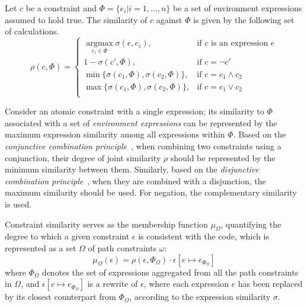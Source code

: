 \begin{definition}
Let $c$ be a constraint and $\Phi = \{e_i | i=1,\ldots,n\}$ be a set of
environment expressions assumed to hold true.
The similarity of $c$ against $\Phi$ is given by the following set of calculations.
\begin{equation}\label{eq:js}
    \rho(c,\Phi) =
    \begin{cases}
        \mathop{\arg\max}\limits_{e_i \in \Phi} \sigma(e, e_i),
        & \text{if } c \text{ is an expression } e \\
        1 - \sigma(c', \Phi), & \text{if $c = \neg c'$} \\
        \min\{\sigma(c_1, \Phi), \sigma(c_2, \Phi)\}, & \text{if } c = c_1 \wedge c_2 \\
        \max\{\sigma(c_1, \Phi), \sigma(c_2, \Phi)\}, & \text{if } c = c_1 \vee c_2 \\
    \end{cases}
\end{equation}
\end{definition}

Consider an atomic constraint with a single expression; its similarity to $\Phi$ associated with
a set of \emph{environment expressions} can be represented by the maximum expression similarity among
all expressions within $\Phi$.
Based on the \textit{conjunctive combination principle}~\cite{zadeh1965fuzzy}, when combining two
constraints using a conjunction, their degree of joint similarity $\rho$ should be represented by
the minimum similarity between them. Similarly, based on the \textit{disjunctive combination
principle}~\cite{zadeh1965fuzzy}, when they are combined with a disjunction, the maximum similarity
should be used. For negation, the complementary similarity is used.



\begin{definition}
Constraint similarity serves as the membership function $\mu_{\Omega}$, quantifying the degree to
which a given constraint $\epsilon$ is consistent with the code, which is represented as a set
$\Omega$ of path constraints $\omega$:
\begin{equation}
\mu_{\Omega}(\epsilon) = \rho(\epsilon, \Phi_\Omega) \cdot \epsilon[e \mapsto e_{\Phi_\Omega}]
\end{equation}
where $\Phi_\Omega$ denotes the set of expressions aggregated from all the path constraints in
$\Omega$, and $\epsilon[e \mapsto e_{\Phi_\Omega}]$ is a rewrite of $\epsilon$, where each
expression $e$ has been replaced by its closest counterpart from $\Phi_\Omega$, according to the expression similarity $\sigma$.
\end{definition}


